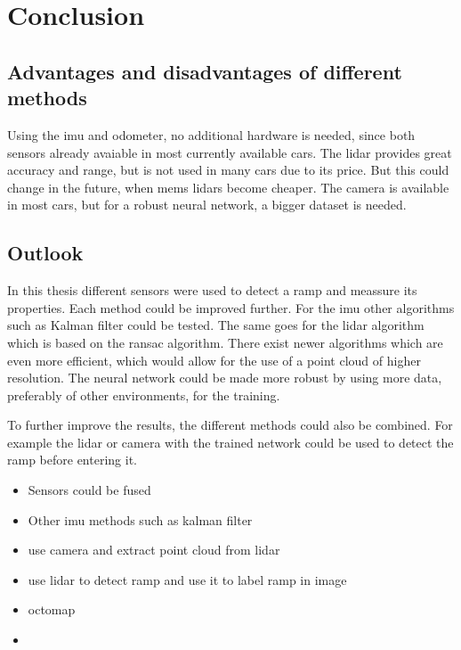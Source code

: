 \chapter{Conclusion}
\label{ch:Conclusion}
\section{Advantages and disadvantages of different methods}
Using the \gls{imu} and odometer, no additional hardware is needed, since both sensors already avaiable in most currently available cars.
The \gls{lidar} provides great accuracy and range, but is not used in many cars due to its price.
But this could change in the future, when \gls{mems} \glspl{lidar} become cheaper.
The camera is available in most cars, but for a robust neural network, a bigger dataset is needed.

\section{Outlook}
In this thesis different sensors were used to detect a ramp and meassure its properties.
Each method could be improved further.
For the \gls{imu} other algorithms such as Kalman filter could be tested.
The same goes for the \gls{lidar} algorithm which is based on the \gls{ransac} algorithm.
There exist newer algorithms which are even more efficient, which would allow for the use of a point cloud of higher resolution.
The neural network could be made more robust by using more data, preferably of other environments, for the training.\par
To further improve the results, the different methods could also be combined.
For example the \gls{lidar} or camera with the trained network could be used to detect the ramp before entering it.

\begin{itemize}
	\item Sensors could be fused
	\item Other \gls{imu} methods such as kalman filter
	\item use camera and extract point cloud from \gls{lidar}
	\item use \gls{lidar} to detect ramp and use it to label ramp in image
	\item octomap
	\item
\end{itemize}


